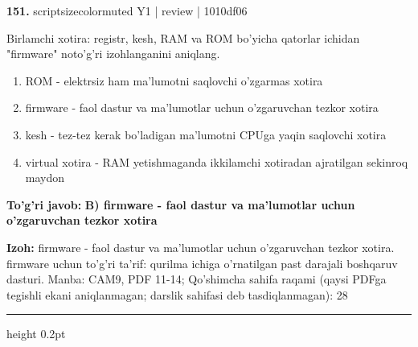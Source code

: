 \documentclass[10pt,a4paper]{article}
\begin{document}
{\bfseries\sffamily\color{ink} 151.} {scriptsizecolor{muted} Y1 | review | 1010df06}
\par
Birlamchi xotira: registr, kesh, RAM va ROM bo'yicha qatorlar ichidan "firmware" noto'g'ri izohlanganini aniqlang.
\begin{enumerate}[label=\Alph*),leftmargin=9mm]
\item ROM - elektrsiz ham ma'lumotni saqlovchi o'zgarmas xotira
\item firmware - faol dastur va ma'lumotlar uchun o'zgaruvchan tezkor xotira
\item kesh - tez-tez kerak bo'ladigan ma'lumotni CPUga yaqin saqlovchi xotira
\item virtual xotira - RAM yetishmaganda ikkilamchi xotiradan ajratilgan sekinroq maydon
\end{enumerate}
\begin{tcolorbox}[enhanced,breakable,colback=teal!4,colframe=teal!60!black,boxrule=0.45pt,arc=1.2mm,left=2.7mm,right=2.7mm,top=1.8mm,bottom=1.8mm,before skip=2mm,after skip=2mm]
{\bfseries\sffamily\color{teal}To'g'ri javob:} \textbf{B) firmware - faol dastur va ma'lumotlar uchun o'zgaruvchan tezkor xotira}
\par\smallskip
{\bfseries Izoh:} firmware - faol dastur va ma'lumotlar uchun o'zgaruvchan tezkor xotira. firmware uchun to'g'ri ta'rif: qurilma ichiga o'rnatilgan past darajali boshqaruv dasturi. Manba: CAM9, PDF 11-14; Qo'shimcha sahifa raqami (qaysi PDFga tegishli ekani aniqlanmagan; darslik sahifasi deb tasdiqlanmagan): 28
\end{tcolorbox}
\vspace{2mm}\hrule height 0.2pt\vspace{3mm}
\end{document}
